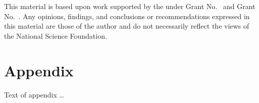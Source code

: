 \documentclass[sigplan,review,anonymous]{acmart}\settopmatter{printfolios=true,printccs=false,printacmref=false}
\begin{document}
\begin{acks}                            %
  This material is based upon work supported by the
   under Grant
  No.~ and Grant
  No.~.  Any opinions, findings, and
  conclusions or recommendations expressed in this material are those
  of the author and do not necessarily reflect the views of the
  National Science Foundation.
\end{acks}


%


\appendix
\section{Appendix}

Text of appendix \ldots
\end{document}
